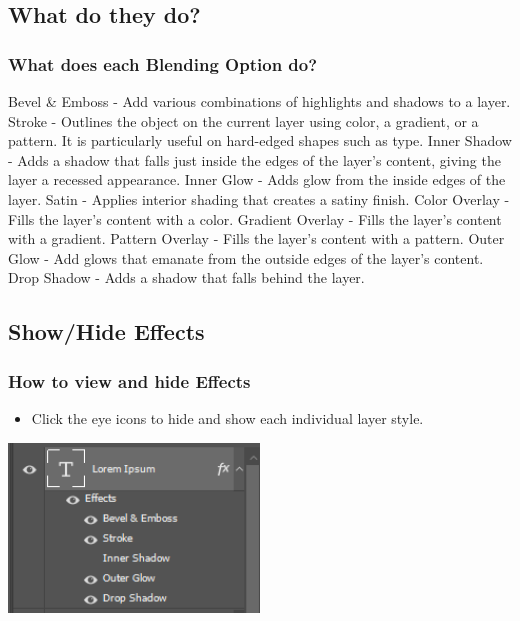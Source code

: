 \documentclass{beamer}
\begin{document}
	\subsection{What do they do?}
	\begin{frame}
	\frametitle{What does each Blending Option do?}
	\begin{outline}
		\1 Bevel \& Emboss - Add various combinations of highlights and shadows to a layer.
		\1 Stroke - Outlines the object on the current layer using color, a gradient, or a pattern. It is particularly useful on hard-edged shapes such as type.
		\1 Inner Shadow - Adds a shadow that falls just inside the edges of the layer's content, giving the layer a recessed appearance.
		\1 Inner Glow - Adds glow from the inside edges of the layer.
		\1 Satin - Applies interior shading that creates a satiny finish.
		\1 Color Overlay - Fills the layer's content with a color.
		\1 Gradient Overlay - Fills the layer's content with a gradient.
		\1 Pattern Overlay - Fills the layer's content with a pattern.
		\1 Outer Glow - Add glows that emanate from the outside edges of the layer's content.
		\1 Drop Shadow - Adds a shadow that falls behind the layer.
	\end{outline}
\end{frame}

\subsection{Show/Hide Effects}
	\begin{frame}
	\frametitle{How to view and hide Effects}
	\begin{itemize}
		\item Click the eye icons to hide and show each individual layer style.
	\end{itemize}
	\begin{center}
			\includegraphics[width = 0.5\textwidth]{images/effects3.png}
	\end{center}
\end{frame}
\end{document}
